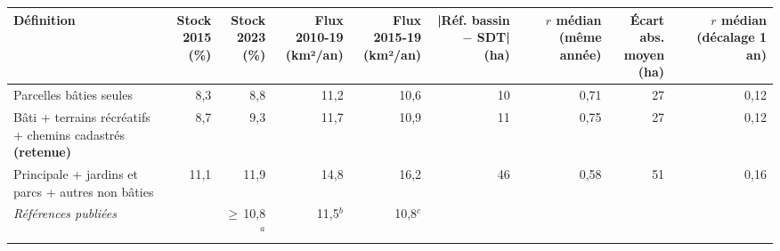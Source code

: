 \begin{tabular}{p{4.4cm}rrrrrrrr}
\toprule
Définition & \makecell{Stock\\2015 (\%)} & \makecell{Stock\\2023 (\%)} & \makecell{Flux 2010-19\\(km²/an)} & \makecell{Flux 2015-19\\(km²/an)} & \makecell{|Réf. bassin\\ $-$ SDT| (ha)} & \makecell{$r$ médian\\(même année)} & \makecell{Écart abs.\\moyen (ha)} & \makecell{$r$ médian\\(décalage 1 an)} \\
\midrule
Parcelles bâties seules & 8{,}3 & 8{,}8 & 11{,}2 & 10{,}6 & 10 & 0{,}71 & 27 & 0{,}12 \\
Bâti + terrains récréatifs + chemins cadastrés \textbf{(retenue)} & 8{,}7 & 9{,}3 & 11{,}7 & 10{,}9 & 11 & 0{,}75 & 27 & 0{,}12 \\
Principale + jardins et parcs + autres non bâties & 11{,}1 & 11{,}9 & 14{,}8 & 16{,}2 & 46 & 0{,}58 & 51 & 0{,}16 \\
\addlinespace \emph{Références publiées} & & $\geq$\,10{,}8$^{a}$ & 11{,}5$^{b}$ & 10{,}8$^{c}$ & & & & \\
\bottomrule
\end{tabular}
